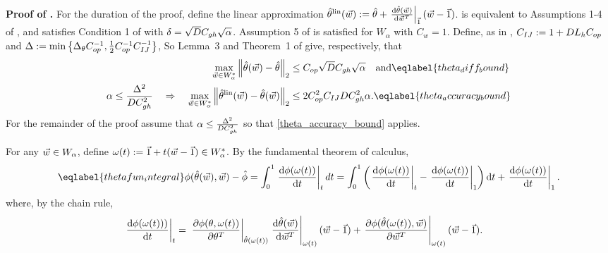
\textbf{Proof of .}
%
\sloppy For the duration of the proof, define the linear approximation
$\hat{\theta}^{\mathrm{lin}}(\vec{w}) := \hat{\theta} + \left.\frac{\mathrm{d}\hat{\theta}(\vec{w})}{\mathrm{d}\vec{w}^T}\right|_{\vec{1}}(\vec{w} -
\vec{1})$.  is equivalent to Assumptions 1-4 of
\citet{giordano:2019:swiss}, and  satisfies Condition 1
of \citet{giordano:2019:swiss} with $\delta = \sqrt{D} C_{gh} \sqrt{\alpha}$.
Assumption 5 of \citet{giordano:2019:swiss} is satisfied for $W_\alpha$ with
$C_w = 1$. Define, as in \citet{giordano:2019:swiss}, $C_{IJ} := 1 + D L_{h} C_{op}$
and $\Delta := \min\left\{\Delta_\theta C_{op}^{-1}, \frac{1}{2}C_{op}^{-1}C_{IJ}^{-1}
\right\}$, So Lemma~3 and Theorem~1 of \citet{giordano:2019:swiss} give,
respectively, that
%
\begin{align}
%
\max_{\w \in W_\alpha^*}
    \vnorm{\thetahat(\w) - \thetahat}_2 \le{}& \cop \sqrt{D} \cgh \sqrt{\alpha}
\quad \textrm{and}  \eqlabel{theta_diff_bound} \\
%
\alpha \le
\frac{\Delta^2}{D\cgh^2} \quad\Rightarrow\quad
%
\max_{\w \in W_\alpha^*}\vnorm{\thetalin(\w) - \thetahat(\w)}_2
    \le{}& 2 \cop^2 \cij D \cgh^2 \alpha. \eqlabel{theta_accuracy_bound}
%
\end{align}
%
For the remainder of the proof assume that $\alpha \le
\frac{\Delta^2}{DC_{gh}^2}$ so that \eqref{theta_accuracy_bound} applies.

For any $\vec{w} \in W_\alpha$, define $\omega(t) := \vec{1} + t (\vec{w} - \vec{1})  \in
W_\alpha^*$. By the fundamental theorem of calculus,
%
\begin{align}\eqlabel{thetafun_integral}
%
\thetafun(\thetahat(\w), \w) - \thetafunhat = \int_0^1
    \fracat{\dee \thetafun(\omega(t))}{\dee t}{t}dt
=
\int_0^1
    \left( \fracat{\dee \thetafun(\omega(t))}{\dee t}{t} -
           \fracat{\dee \thetafun(\omega(t))}{\dee t}{1}\right)\dee t +
    \fracat{\dee \thetafun(\omega(t))}{\dee t}{1}.
%
\end{align}
%
where, by the chain rule,
%
\begin{align*}
%
\fracat{\dee \thetafun(\omega(t)))}{\dee t}{t}
={}&
\fracat{\partial \thetafun(\theta, \omega(t))}
       {\partial \theta^T}{\thetahat(\omega(t))}
\fracat{\dee \thetahat(\w)}{\dee \w^T}{\omega(t)} (\w - \onevec) +
\fracat{\partial \thetafun(\thetahat(\omega(t)), \w)}
       {\partial \w^T}{\omega(t)} (\w - \onevec).
%
\end{align*}

